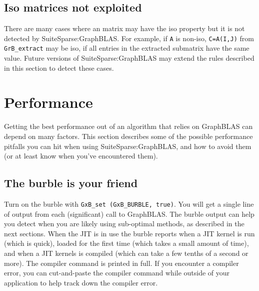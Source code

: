 \documentclass[12pt]{article}
\begin{document}
\subsection{Iso matrices not exploited}

There are many cases where an matrix may have the iso property but it is not
detected by SuiteSparse:GraphBLAS.  For example, if \verb'A' is non-iso,
\verb'C=A(I,J)' from \verb'GrB_extract' may be iso, if all entries in the
extracted submatrix have the same value.  Future versions of
SuiteSparse:GraphBLAS may extend the rules described in this section to detect
these cases.

\newpage
\section{Performance} %
\label{perf}

Getting the best performance out of an algorithm that relies on GraphBLAS can
depend on many factors.  This section describes some of the possible
performance pitfalls you can hit when using SuiteSparse:GraphBLAS, and how to
avoid them (or at least know when you've encountered them).

\subsection{The burble is your friend}

Turn on the burble with \verb'GxB_set (GxB_BURBLE, true)'.  You will get a
single line of output from each (significant) call to GraphBLAS.
The burble output can help you detect when you are likely using sub-optimal
methods, as described in the next sections.
When the JIT is in use the burble reports when a JIT kernel is run (which
is quick), loaded for the first time (which takes a small amount of time),
and when a JIT kernels is compiled (which can take a few tenths of a second
or more).  The compiler command is printed in full.  If you encounter a
compiler error, you can cut-and-paste the compiler command while outside
of your application to help track down the compiler error.
\end{document}

